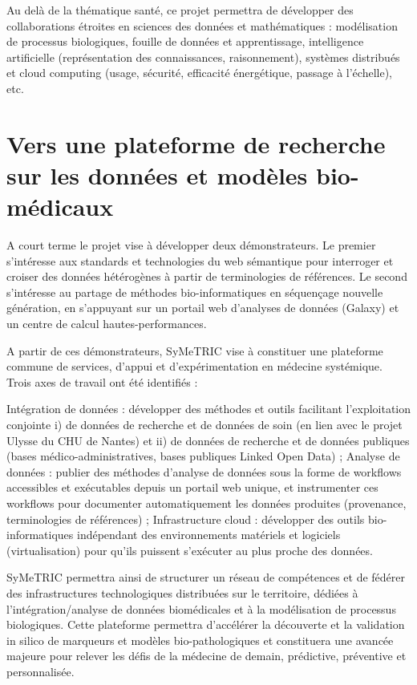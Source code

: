 \documentclass[a4paper,11pt]{article}
\theoremstyle{definition}
\begin{document}
Au delà de la thématique santé, ce projet permettra de développer des collaborations étroites en sciences des données et mathématiques : modélisation de processus biologiques, fouille de données et apprentissage, intelligence artificielle (représentation des connaissances, raisonnement), systèmes distribués et cloud computing (usage, sécurité, efficacité énergétique, passage à l’échelle), etc. 

\section{Vers une plateforme de recherche sur les données et modèles bio-médicaux}
A court terme le projet vise à développer deux démonstrateurs. Le premier s’intéresse aux standards et technologies du web sémantique pour interroger et croiser des données hétérogènes à partir de terminologies de références. Le second s’intéresse au partage de méthodes bio-informatiques en séquençage nouvelle génération, en s’appuyant sur un portail web d’analyses de données (Galaxy) et un centre de calcul hautes-performances. 

A partir de ces démonstrateurs, SyMeTRIC vise à constituer une plateforme commune de services, d’appui et d’expérimentation en médecine systémique. Trois axes de travail ont été identifiés : 

Intégration de données : développer des méthodes et outils facilitant l’exploitation conjointe i) de données de recherche et de données de soin (en lien avec le projet Ulysse du CHU de Nantes) et ii) de données de recherche et de données publiques (bases médico-administratives, bases publiques Linked Open Data) ; 
Analyse de données : publier des méthodes d’analyse de données sous la forme de workflows accessibles et exécutables depuis un portail web unique, et instrumenter ces workflows pour documenter automatiquement les données produites (provenance, terminologies de références) ; 
Infrastructure cloud : développer des outils bio-informatiques indépendant des environnements matériels et logiciels (virtualisation) pour qu’ils puissent s’exécuter au plus proche des données. 

SyMeTRIC permettra ainsi de structurer un réseau de compétences et de fédérer des infrastructures technologiques distribuées sur le territoire, dédiées à l’intégration/analyse de données biomédicales et à la modélisation de processus biologiques. Cette plateforme permettra d’accélérer la découverte et la validation in silico de marqueurs et modèles bio-pathologiques et constituera une avancée majeure pour relever les défis de la médecine de demain, prédictive, préventive et personnalisée. 
\end{document}
